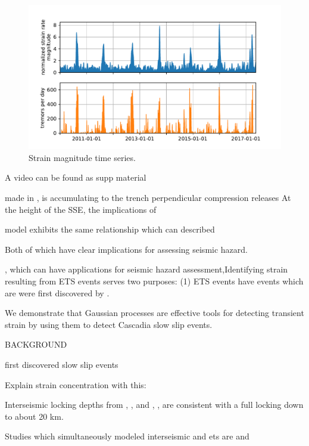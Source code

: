 \documentclass[10pt,a4paper]{article}
\begin{document}
\begin{figure}
\includegraphics{figures/strain_ts/mag-ts.pdf}
\caption{Strain magnitude time series.}   
\label{fig:StrainMag}
\end{figure}

A video can be found as supp material 

made in ,  is accumulating to the trench perpendicular compression releases At the height of the SSE, the implications of    
  
model exhibits the same relationship  which can described  


Both of which have clear implications for assessing seismic hazard.

, which can have applications for seismic hazard assessment,Identifying strain resulting from ETS events serves two purposes: (1) ETS events have  events which are  were first discovered by \citet{Dragert2001}.   


We demonstrate that Gaussian processes are effective tools for detecting transient strain by using them to detect Cascadia slow slip events.  

BACKGROUND

\citet{Dragert2001} first discovered slow slip events

Explain strain concentration with this:

 
Interseismic locking depths from \citet{Fluck1997}, \citet{Murray2000}, \citet{McCaffrey2007} and \citet{McCaffrey2013}, \citet{Burgette2009}, \citet{schmalzle2014} are consistent with a full locking down to about 20 km.

Studies which simultaneously modeled interseismic and ets are \citet{Holtkamp2010} and \citet{schmalzle2014}
\end{document}
